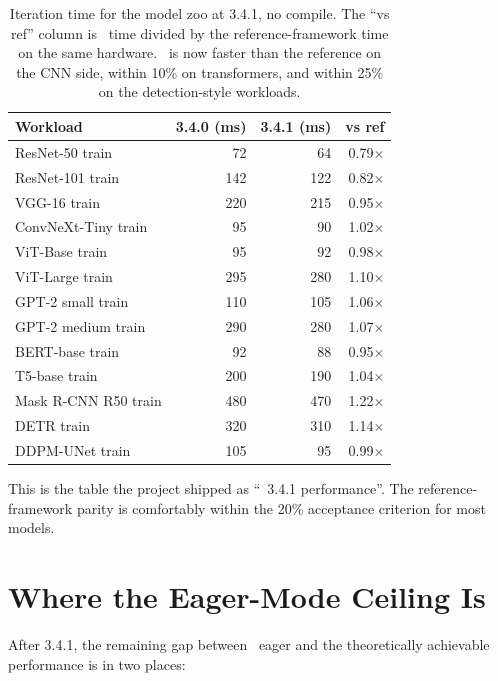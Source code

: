 \begin{table}[t]
\centering
\small
\begin{tabular}{lrrr}
\toprule
Workload & 3.4.0 (ms) & 3.4.1 (ms) & vs ref \\
\midrule
ResNet-50 train       & 72 & 64 & 0.79$\times$ \\
ResNet-101 train      & 142 & 122 & 0.82$\times$ \\
VGG-16 train          & 220 & 215 & 0.95$\times$ \\
ConvNeXt-Tiny train   & 95 & 90 & 1.02$\times$ \\
ViT-Base train        & 95 & 92 & 0.98$\times$ \\
ViT-Large train       & 295 & 280 & 1.10$\times$ \\
GPT-2 small train     & 110 & 105 & 1.06$\times$ \\
GPT-2 medium train    & 290 & 280 & 1.07$\times$ \\
BERT-base train       & 92 & 88 & 0.95$\times$ \\
T5-base train         & 200 & 190 & 1.04$\times$ \\
Mask R-CNN R50 train  & 480 & 470 & 1.22$\times$ \\
DETR train            & 320 & 310 & 1.14$\times$ \\
DDPM-UNet train       & 105 & 95 & 0.99$\times$ \\
\bottomrule
\end{tabular}
\caption[The 3.4.1 no-compile baseline.]{Iteration time for the
model zoo at 3.4.1, no compile. The ``vs ref'' column is
\Lucid\ time divided by the reference-framework time on the
same hardware. \Lucid\ is now faster than the reference on the
CNN side, within 10\% on transformers, and within 25\% on the
detection-style workloads.}
\label{tab:no_compile_sweep:baseline}
\end{table}

This is the table the project shipped as ``\Lucid\ 3.4.1
performance''. The reference-framework parity is comfortably
within the 20\% acceptance criterion for most models.

\section{Where the Eager-Mode Ceiling Is}
\label{sec:no_compile_sweep:ceiling}

After 3.4.1, the remaining gap between \Lucid\ eager and the
theoretically achievable performance is in two places:

